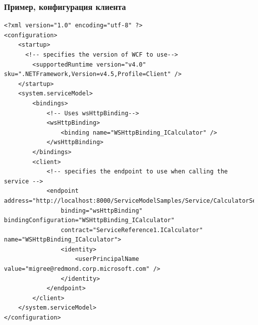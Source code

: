 \documentclass[xetex,mathserif,serif]{beamer}
\begin{document}
	\begin{frame}[fragile]
		\frametitle{Пример, конфигурация клиента}
		\begin{ssmall}
			\begin{verbatim}
<?xml version="1.0" encoding="utf-8" ?>  
<configuration>  
    <startup>   
      <!-- specifies the version of WCF to use-->  
        <supportedRuntime version="v4.0" sku=".NETFramework,Version=v4.5,Profile=Client" />  
    </startup>  
    <system.serviceModel>  
        <bindings>  
            <!-- Uses wsHttpBinding-->  
            <wsHttpBinding>  
                <binding name="WSHttpBinding_ICalculator" />  
            </wsHttpBinding>  
        </bindings>  
        <client>  
            <!-- specifies the endpoint to use when calling the service -->  
            <endpoint address="http://localhost:8000/ServiceModelSamples/Service/CalculatorService"  
                binding="wsHttpBinding" bindingConfiguration="WSHttpBinding_ICalculator"  
                contract="ServiceReference1.ICalculator" name="WSHttpBinding_ICalculator">  
                <identity>  
                    <userPrincipalName value="migree@redmond.corp.microsoft.com" />  
                </identity>  
            </endpoint>  
        </client>  
    </system.serviceModel>  
</configuration>
			\end{verbatim}
		\end{ssmall}
	\end{frame}
\end{document}
